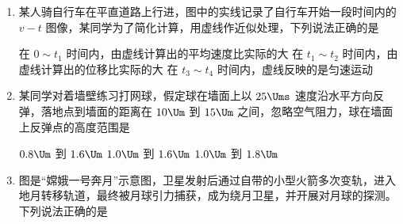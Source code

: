 \documentclass[\gkver]{gaokaozhenti}
\begin{document}
\begin{enumerate}

\item
某人骑自行车在平直道路上行进，图中的实线记录了自行车开始一段时间内的 $v-t$ 图像，某同学为了简化计算，用虚线作近似处理，下列说法正确的是


{在 $0\sim t_{1}$ 时间内，由虚线计算出的平均速度比实际的大}
{在 $t_{1}\sim t_{2}$ 时间内，由虚线计算出的位移比实际的大}
{在 $t_{3}\sim t_{4}$ 时间内，虚线反映的是匀速运动}


\item
某同学对着墙壁练习打网球，假定球在墙面上以 $25\Ums$ 速度沿水平方向反弹，落地点到墙面的距离在 $10\Um$ 到 $15\Um$ 之间，忽略空气阻力，球在墙面上反弹点的高度范围是

{$0.8\Um$ 到 $1.6\Um$}
{$1.0\Um$ 到 $1.6\Um$}
{$1.0\Um$ 到 $1.8\Um$}


\item
图是“嫦娥一号奔月”示意图，卫星发射后通过自带的小型火箭多次变轨，进入地月转移轨道，最终被月球引力捕获，成为绕月卫星，并开展对月球的探测。下列说法正确的是


\end{enumerate}
\end{document}
